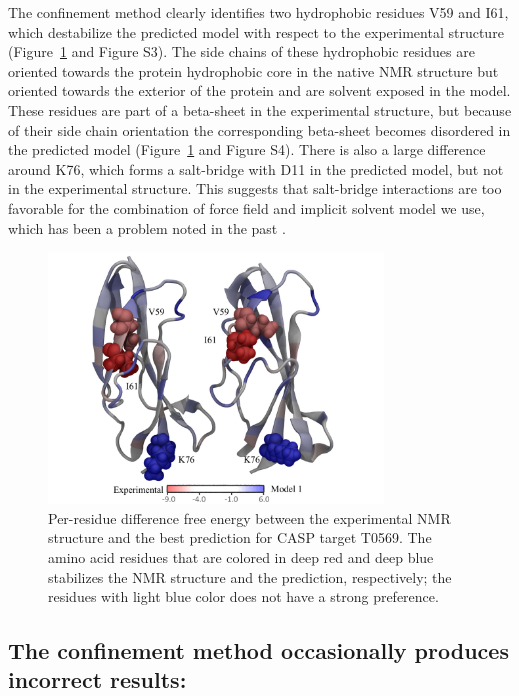 \documentclass[12pt]{article}
\begin{document}
The confinement method clearly identifies two hydrophobic residues V59 and I61, which destabilize the predicted model
with respect to the experimental structure (Figure~\ref{fig:T0569_per_residue} and Figure S3). The side chains of
these hydrophobic residues are oriented towards the protein hydrophobic core in the native NMR structure but oriented
towards the exterior of the protein and are solvent exposed in the model. These residues are part of a beta-sheet
in the experimental structure, but because of their side chain orientation the corresponding
beta-sheet becomes disordered in the predicted model 
(Figure~\ref{fig:T0569_per_residue} and Figure S4). There is also a large
difference around K76, which forms a salt-bridge with D11 in the predicted model, but not in the experimental structure.
This suggests that salt-bridge interactions are too favorable for the combination of force field and implicit solvent
model we use, which has been a problem noted in the past \cite{Roe2007}.

\begin{figure}
    \begin{center}
        \includegraphics[width=3.5in]{T0569_perres1.pdf}
    \end{center}
    \caption{Per-residue difference free energy between the experimental NMR structure and the best prediction for CASP
        target T0569. The amino acid residues that are colored in deep red and deep blue stabilizes the NMR structure
        and the prediction, respectively; the residues with light blue color does not have a strong preference.}
\label{fig:T0569_per_residue}
\end{figure}

\subsection*{The confinement method occasionally produces incorrect results:}
\end{document}
